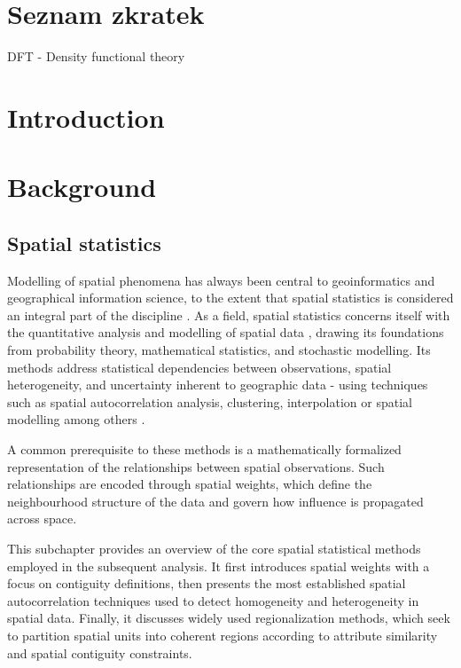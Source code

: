 \documentclass[
  english,
  12pt,
  a4paper,
]{article}
\begin{document}
\newpage

\section*{Seznam zkratek}
DFT - Density functional theory
\newpage

\tableofcontents
\newpage

\pagestyle{plain}

\section{Introduction}\label{introduction}

\section{Background}\label{background}

\subsection{Spatial statistics}\label{spatial-statistics}

Modelling of spatial phenomena has always been central to geoinformatics
and geographical information science, to the extent that spatial
statistics is considered an integral part of the discipline
\citep{goodchild1992}. As a field, spatial statistics concerns itself
with the quantitative analysis and modelling of spatial data
\citep{pilz2025}, drawing its foundations from probability theory,
mathematical statistics, and stochastic modelling. Its methods address
statistical dependencies between observations, spatial heterogeneity,
and uncertainty inherent to geographic data - using techniques such as
spatial autocorrelation analysis, clustering, interpolation or spatial
modelling among others \citep[\citet{handbook2010}]{ripley1981}.

A common prerequisite to these methods is a mathematically formalized
representation of the relationships between spatial observations. Such
relationships are encoded through spatial weights, which define the
neighbourhood structure of the data and govern how influence is
propagated across space.

This subchapter provides an overview of the core spatial statistical
methods employed in the subsequent analysis. It first introduces spatial
weights with a focus on contiguity definitions, then presents the most
established spatial autocorrelation techniques used to detect
homogeneity and heterogeneity in spatial data. Finally, it discusses
widely used regionalization methods, which seek to partition spatial
units into coherent regions according to attribute similarity and
spatial contiguity constraints.
\end{document}
